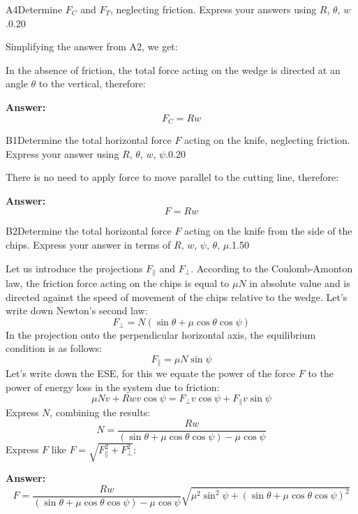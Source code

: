 \documentclass[11pt,a4paper]{article}
\begin{document}
\begin{solcard}{A4}{Determine $F_C$ and $F_T$, neglecting friction. Express your answers using $R$, $\theta$, $w$.}{0.20}

Simplifying the answer from A2, we get:


In the absence of friction, the total force acting on the wedge is directed at an angle $\theta$ to the vertical, therefore:

\par\smallskip\noindent\textbf{Answer:} \[F_C=Rw\]
\end{solcard}

\begin{solcard}{B1}{Determine the total horizontal force $F$ acting on the knife, neglecting friction. Express your answer using $R$, $\theta$, $w$, $\psi$.}{0.20}

There is no need to apply force to move parallel to the cutting line, therefore:

\par\smallskip\noindent\textbf{Answer:} \[F=Rw\]
\end{solcard}

\begin{solcard}{B2}{Determine the total horizontal force $F$ acting on the knife from the side of the chips. Express your answer in terms of $R$, $w$, $\psi$, $\theta$, $\mu$.}{1.50}

Let us introduce the projections $F_{\parallel}$ and $F_{\perp}$. According to the Coulomb-Amonton law, the friction force acting on the chips is equal to $\mu N$ in absolute value and is directed against the speed of movement of the chips relative to the wedge. Let's write down Newton's second law: \[F_{\perp}=N(\sin\theta+\mu\cos\theta\cos\psi)\]In the projection onto the perpendicular horizontal axis, the equilibrium condition is as follows: \[F_{\parallel}=\mu N\sin\psi\]Let's write down the ESE, for this we equate the power of the force $F$ to the power of energy loss in the system due to friction: \[\mu N v+Rwv\cos\psi=F_{\perp} v\cos\psi+F_{\parallel} v\sin\psi\]Express $N$, combining the results: \[N=\dfrac{Rw}{(\sin\theta+\mu\cos\theta\cos\psi)-\mu\cos\psi}\]Express $F$ like $F=\sqrt{F_{\parallel}^2+F_{\perp}^2}$:

\par\smallskip\noindent\textbf{Answer:} \[F=\dfrac{Rw}{(\sin\theta+\mu\cos\theta\cos\psi)-\mu\cos\psi}\sqrt{\mu^2\sin^2\psi+(\sin\theta+\mu\cos\theta\cos\psi)^2}\]
\end{solcard}
\end{document}
